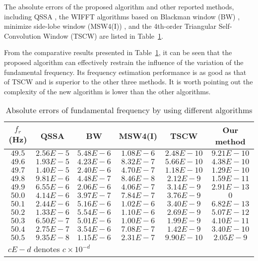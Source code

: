 \documentclass[journal,twoside]{IEEEtran}
\begin{document}
The absolute errors of the proposed algorithm and other reported methods, including QSSA \cite{Zhou2011}, the WIFFT algorithms based on Blackman window (BW) \cite{Harris1978}, minimize side-lobe window (MSW4(I)) \cite{Wen2011}, and the 4th-order Triangular Self-Convolution Window (TSCW) \cite{Wen2014} are listed in Table~\ref{table_2}.

From the comparative results presented in Table~\ref{table_2}, it can be seen that the proposed algorithm can effectively restrain the influence of the variation of the fundamental frequency. Its frequency estimation performance is as good as that of TSCW and is superior to the other three methods. It is worth pointing out the complexity of the new algorithm is lower than the other algorithms.
\begin{table}
	\renewcommand{\arraystretch}{1.3}
	\caption{Absolute errors of fundamental frequency by using different algorithms}
	\label{table_2}
	\centering
	\begin{tabular}{@{ }c@{ }@{ }c@{ }@{ }c@{ }@{ }c@{ }@{ }c@{ }@{ }c@{ }}
		\toprule
		$f_r$ (Hz) & QSSA      & BW        & MSW4(I)   & TSCW       & \textbf{Our method}\\
		\midrule
		$49.5$     & $2.56E-5$ & $5.48E-6$ & $1.08E-6$ & $2.48E-10$ & $9.21E-10$ \\
		$49.6$     & $1.93E-5$ & $4.23E-6$ & $8.32E-7$ & $5.66E-10$ & $4.38E-10$ \\
		$49.7$     & $1.40E-5$ & $2.40E-6$ & $4.70E-7$ & $1.18E-10$ & $1.29E-10$ \\
		$49.8$     & $9.81E-6$ & $4.48E-7$ & $8.46E-8$ & $2.12E-9$  & $1.59E-11$ \\
		$49.9$     & $6.55E-6$ & $2.06E-6$ & $4.06E-7$ & $3.14E-9$  & $2.91E-13$ \\
		$50.0$     & $4.14E-6$ & $3.97E-7$ & $7.84E-7$ & $3.76E-9$  & $0$        \\
		$50.1$     & $2.44E-6$ & $5.16E-6$ & $1.02E-6$ & $3.40E-9$  & $6.82E-13$ \\
		$50.2$     & $1.33E-6$ & $5.54E-6$ & $1.10E-6$ & $2.69E-9$  & $5.07E-12$ \\
		$50.3$     & $6.50E-7$ & $5.01E-6$ & $1.00E-6$ & $1.99E-9$  & $4.10E-11$ \\
		$50.4$     & $2.75E-7$ & $3.54E-6$ & $7.08E-7$ & $1.42E-9$  & $3.40E-10$ \\
		$50.5$     & $9.35E-8$ & $1.15E-6$ & $2.31E-7$ & $9.90E-10$ & $2.05E-9$ \\
		\bottomrule
		\multicolumn{6}{l}{$cE-d$ denotes $c\times10^{-d}$}\\
	\end{tabular}
\end{table}
\end{document}
